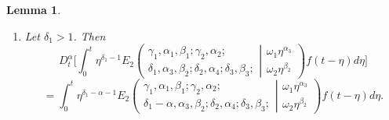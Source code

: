 \documentclass[10pt,a4paper]{amsart}
\newtheorem{lem}{Lemma}
\begin{document}
\begin{lem}
\begin{enumerate}
\begin{equation}
    \end{equation}
    \item  Let $\delta_1>1$. Then
    \begin{equation*}
    D_t^\alpha \bigg[\int_0^t \eta^{\delta_1-1} E_2\left(\begin{array}{c}
\gamma_1,\alpha_1, \beta_1 ; \gamma_2, \alpha_2 ; \\
\delta_1, \alpha_3, \beta_2 ;\delta_2, \alpha_4; \delta_3, \beta_3 ; 
\end{array} \left| 
\begin{array}{c}
\omega_1 \eta^{\alpha_3} \\
\omega_2 \eta^{\beta_2} 
\end{array} 
\right.
\right)f(t-\eta) d\eta \bigg] 
\end{equation*}
\begin{equation}\label{jumaeva:eq:10}
=\int_0^t \eta^{\delta_1-\alpha-1} E_2\left(\begin{array}{c}
\gamma_1,\alpha_1, \beta_1 ; \gamma_2, \alpha_2 ; \\
\delta_1-\alpha, \alpha_3, \beta_2 ;\delta_2, \alpha_4; \delta_3, \beta_3 ; 
\end{array} \left| 
\begin{array}{c}
\omega_1 \eta^{\alpha_3} \\
\omega_2 \eta^{\beta_2} 
\end{array} 
\right.
\right) f(t-\eta) d\eta.
\end{equation}
\end{enumerate}\label{jumaeva:lem:5} 
\end{lem} 
\end{document}
